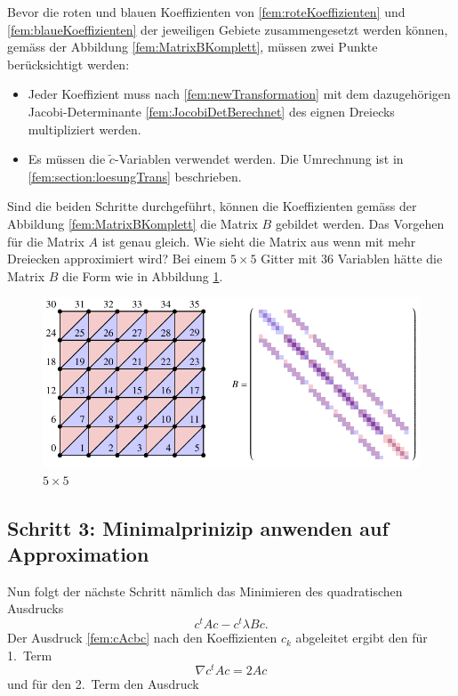 Bevor die roten und blauen Koeffizienten von \eqref{fem:roteKoeffizienten} und \eqref{fem:blaueKoeffizienten} der jeweiligen Gebiete zusammengesetzt werden können, gemäss der Abbildung \ref{fem:MatrixBKomplett}, müssen zwei Punkte berücksichtigt werden:
\begin{itemize}
	\item Jeder Koeffizient muss nach \eqref{fem:newTransformation}
	mit dem dazugehörigen Jacobi-Determinante
	\eqref{fem:JocobiDetBerechnet} des eignen Dreiecks multipliziert
	werden.
	\item Es müssen die $\tilde{c}$-Variablen verwendet werden.
	Die Umrechnung ist in  \ref{fem:section:loesungTrans} beschrieben.
\end{itemize}
Sind die beiden Schritte durchgeführt, können die Koeffizienten gemäss der Abbildung \ref{fem:MatrixBKomplett} die Matrix $B$ gebildet werden.
Das Vorgehen für die Matrix $A$ ist genau gleich.
Wie sieht die Matrix aus wenn mit mehr Dreiecken approximiert wird?
Bei einem $5 \times 5$ Gitter mit 36 Variablen hätte die Matrix $B$
die Form wie in Abbildung \ref{fem:MatrixBGross}.

\begin{figure}
\centering
\includegraphics{papers/fem/Images/gross.pdf}
\caption{$5 \times 5$}
\label{fem:MatrixBGross}
\end{figure}


\subsection{Schritt 3: Minimalprinizip anwenden auf Approximation}

Nun folgt der nächste Schritt nämlich das Minimieren des quadratischen Ausdrucks
\begin{equation}
	c^t Ac - c^t \lambda Bc.
	\label{fem:cAcbc}
\end{equation}
Der Ausdruck \eqref{fem:cAcbc} nach den Koeffizienten $c_k$ abgeleitet
ergibt den  für 1.~Term
\begin{equation}
	\nabla c^t Ac = 2Ac
\end{equation}
und für den 2.~Term den Ausdruck

